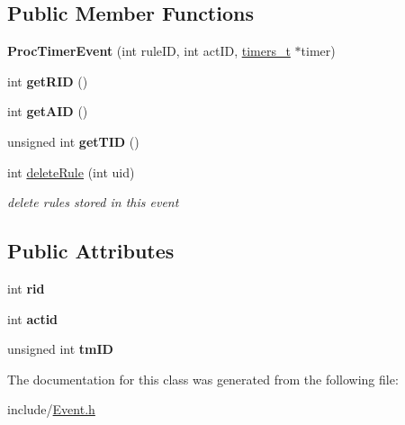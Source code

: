 \subsection*{Public Member Functions}
\begin{DoxyCompactItemize}
\item 
\mbox{\label{classProcTimerEvent_ae81e8a0e9d4913cf10efe6908434952b}} 
{\bfseries Proc\+Timer\+Event} (int rule\+ID, int act\+ID, \hyperlink{structtimers__t}{timers\+\_\+t} $\ast$timer)
\item 
\mbox{\label{classProcTimerEvent_a4b46028129b4d933c38c2ffd7d6e1b87}} 
int {\bfseries get\+R\+ID} ()
\item 
\mbox{\label{classProcTimerEvent_aaba1899c5a1bd53028863262a6d39424}} 
int {\bfseries get\+A\+ID} ()
\item 
\mbox{\label{classProcTimerEvent_ab40244b1fdd5f47487f171eecd49c2b3}} 
unsigned int {\bfseries get\+T\+ID} ()
\item 
\mbox{\label{classProcTimerEvent_aaf40ef6f4e15ff672b004d3856eef860}} 
int \hyperlink{classProcTimerEvent_aaf40ef6f4e15ff672b004d3856eef860}{delete\+Rule} (int uid)
\begin{DoxyCompactList}\small\item\em delete rules stored in this event \end{DoxyCompactList}\end{DoxyCompactItemize}
\subsection*{Public Attributes}
\begin{DoxyCompactItemize}
\item 
\mbox{\label{classProcTimerEvent_aeeedb2fd2c111aba58f733a727cf4e19}} 
int {\bfseries rid}
\item 
\mbox{\label{classProcTimerEvent_a42590019ad4036654c14f04758658c16}} 
int {\bfseries actid}
\item 
\mbox{\label{classProcTimerEvent_ab71572f4955b2851cf4fa12ccd84c5d3}} 
unsigned int {\bfseries tm\+ID}
\end{DoxyCompactItemize}


The documentation for this class was generated from the following file\+:\begin{DoxyCompactItemize}
\item 
include/\hyperlink{Event_8h}{Event.\+h}\end{DoxyCompactItemize}
